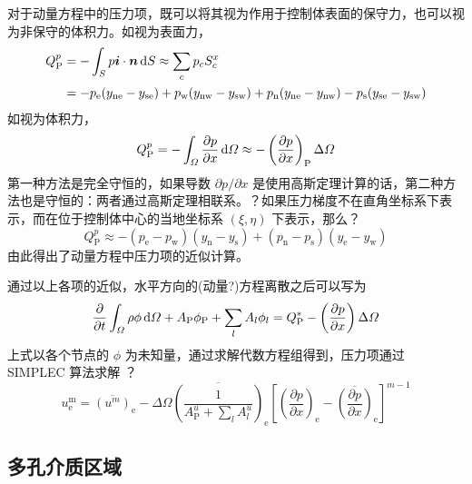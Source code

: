 对于动量方程中的压力项，既可以将其视为作用于控制体表面的保守力，也可以视为非保守的体积力。如视为表面力，
\begin{equation}
\begin{split}
	Q_{\mathrm{P}}^p &= -\int_S p\bm{i}\cdot\bm{n}\,\mathrm{d} S \approx
	\sum_c p_cS_c^x \\
	&= -p_{\mathrm{e}}(y_{\mathrm{ne}}-y_{\mathrm{se}}) +
	p_{\mathrm{w}}(y_{\mathrm{nw}}-y_{\mathrm{sw}}) +
	p_{\mathrm{n}}(y_{\mathrm{ne}}-y_{\mathrm{nw}}) -
	p_{\mathrm{s}}(y_{\mathrm{se}}-y_{\mathrm{sw}})
\end{split}
\end{equation}
如视为体积力，
\begin{equation}
	Q_{\mathrm{P}}^p = 
	-\int_{\varOmega} \frac{\partial p}{\partial x} \,\mathrm{d}\varOmega \approx 
	-\left(\frac{\partial p}{\partial x}\right)_{\mathrm{P}} \Delta\varOmega
\end{equation}
第一种方法是完全守恒的，如果导数 $\partial p/\partial x$ 是使用高斯定理计算的话，第二种方法也是守恒的：两者通过高斯定理相联系。？如果压力梯度不在直角坐标系下表示，而在位于控制体中心的当地坐标系 $(\xi,\eta)$ 下表示，那么？
\begin{equation}
	Q_{\mathrm{P}}^p \approx 
	-(p_{\mathrm{e}}-p_{\mathrm{w}})(y_{\mathrm{n}}-y_{\mathrm{s}}) + 
	(p_{\mathrm{n}}-p_{\mathrm{s}})(y_{\mathrm{e}}-y_{\mathrm{w}})
\end{equation}
由此得出了动量方程中压力项的近似计算。

通过以上各项的近似，水平方向的(动量?)方程离散之后可以写为
\begin{equation}
	\frac{\partial}{\partial t}\int_{\varOmega}\rho\phi\,\mathrm{d}\varOmega +
	A_{\mathrm{P}}\phi_{\mathrm{P}} + \sum_l A_l\phi_l = Q_{\mathrm{P}}^* - \left(\frac{\partial p}{\partial x}\right) \Delta\varOmega
\end{equation}
上式以各个节点的 $\phi$ 为未知量，通过求解代数方程组得到，压力项通过 SIMPLEC 算法求解 \cite{Van1984}？
\begin{equation}\label{eq: Simplec}
	u_{\mathrm{e}}^{\mathrm{m}} = \overline{(u^m)}_{\mathrm{e}} - \Delta\varOmega \overline{\left(\frac{1}{A_{\mathrm{P}}^u+\sum_lA_l^u}\right)}_{\mathrm{e}} \left[\left(\frac{\partial p}{\partial x}\right)_{\mathrm{e}}-\overline{\left(\frac{\partial p}{\partial x}\right)}_{\mathrm{e}}\right]^{m-1}
\end{equation}

\subsection{多孔介质区域}

